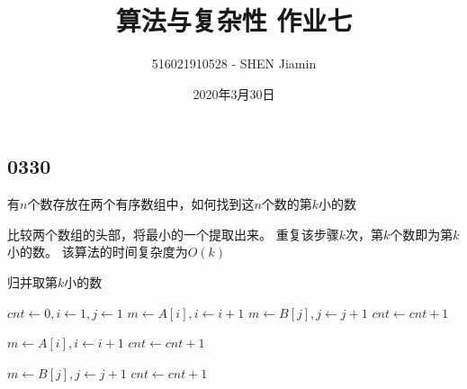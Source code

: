 \documentclass[answers]{exam}
\title{算法与复杂性 \quad 作业七}
\author{516021910528 - SHEN Jiamin}
\date{2020年3月30日}
\begin{document}
\maketitle

\begin{questions}
    \section{0330}\label{sec:0330}

    \question 有$n$个数存放在两个有序数组中，如何找到这$n$个数的第$k$小的数

    \begin{solution}
        比较两个数组的头部，将最小的一个提取出来。
        重复该步骤$k$次，第$k$个数即为第$k$小的数。
        该算法的时间复杂度为$O(k)$

        \begin{algorithm}[H]
            \caption{归并取第$k$小的数}\label{0330:MeargeSmallestK}
            \begin{algorithmic}[1]
                 
                \State $cnt \gets 0, i \gets 1, j \gets 1$
                \State $m \gets A[i], i \gets i + 1$
                \Else
                \State $m \gets B[j], j \gets j + 1$
                \EndIf
                \State $cnt \gets cnt + 1$
                \EndWhile

                \State $m \gets A[i], i \gets i + 1$
                \State $cnt \gets cnt + 1$
                \EndWhile

                \State $m \gets B[j], j \gets j + 1$
                \State $cnt \gets cnt + 1$
                \EndWhile
            \end{algorithmic}
        \end{algorithm}
    \end{solution}


\end{questions}
\end{document}
